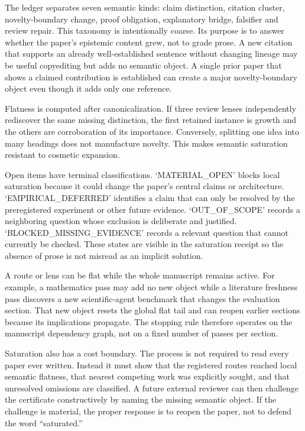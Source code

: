 The ledger separates seven semantic kinds: claim distinction, citation cluster, novelty-boundary change, proof obligation, explanatory bridge, falsifier and review repair. This taxonomy is intentionally coarse. Its purpose is to answer whether the paper's epistemic content grew, not to grade prose. A new citation that supports an already well-established sentence without changing lineage may be useful copyediting but adds no semantic object. A single prior paper that shows a claimed contribution is established can create a major novelty-boundary object even though it adds only one reference.

Flatness is computed after canonicalization. If three review lenses independently rediscover the same missing distinction, the first retained instance is growth and the others are corroboration of its importance. Conversely, splitting one idea into many headings does not manufacture novelty. This makes semantic saturation resistant to cosmetic expansion.

Open items have terminal classifications. `MATERIAL\_OPEN' blocks local saturation because it could change the paper's central claims or architecture. `EMPIRICAL\_DEFERRED' identifies a claim that can only be resolved by the preregistered experiment or other future evidence. `OUT\_OF\_SCOPE' records a neighboring question whose exclusion is deliberate and justified. `BLOCKED\_MISSING\_EVIDENCE' records a relevant question that cannot currently be checked. These states are visible in the saturation receipt so the absence of prose is not misread as an implicit solution.

A route or lens can be flat while the whole manuscript remains active. For example, a mathematics pass may add no new object while a literature freshness pass discovers a new scientific-agent benchmark that changes the evaluation section. That new object resets the global flat tail and can reopen earlier sections because its implications propagate. The stopping rule therefore operates on the manuscript dependency graph, not on a fixed number of passes per section.

Saturation also has a cost boundary. The process is not required to read every paper ever written. Instead it must show that the registered routes reached local semantic flatness, that nearest competing work was explicitly sought, and that unresolved omissions are classified. A future external reviewer can then challenge the certificate constructively by naming the missing semantic object. If the challenge is material, the proper response is to reopen the paper, not to defend the word ``saturated.''

